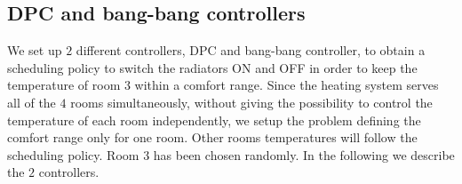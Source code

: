 %
%

\subsection{DPC and bang-bang controllers} We set up $2$ different controllers, DPC and bang-bang controller, to obtain a scheduling policy to switch the radiators ON and OFF in order to keep the temperature of room $3$ within a comfort range. Since the heating system serves all of the $4$ rooms simultaneously, without giving the possibility to control the temperature of each room independently, we setup the problem defining the comfort range only for one room. Other rooms temperatures will follow the scheduling policy. Room $3$ has been chosen randomly. In the following we describe the $2$ controllers.

